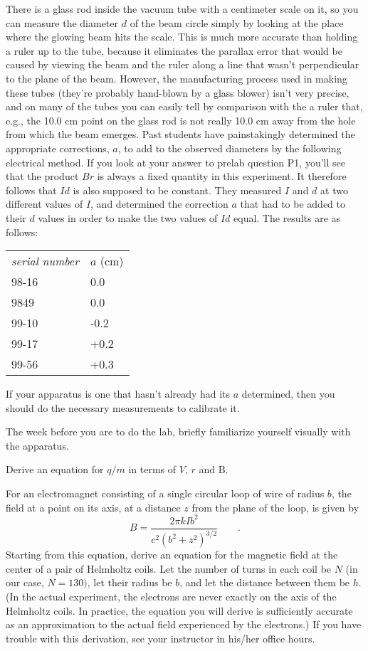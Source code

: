 There is a glass rod inside the vacuum tube
with a centimeter scale
on it, so you can measure the diameter $d$ of the beam circle
simply by looking at the place where the glowing beam hits
the scale. This is much more accurate than holding a ruler
up to the tube, because it eliminates the parallax error
that would be caused by viewing the beam and the ruler along
a line that wasn't perpendicular to the plane of the beam.
However, the manufacturing process used in making these tubes
(they're probably hand-blown by a glass blower) isn't very
precise, and on many of the tubes you can easily tell by comparison
with the a ruler that, e.g., the 10.0 cm point on the glass rod is
not really 10.0 cm away from the hole from which the beam emerges.
Past students have painstakingly determined the appropriate corrections, $a$,
to add to the observed diameters by the following electrical method.
If you look at your answer to prelab question P1, you'll see that the
product $Br$ is always a fixed quantity in this experiment. It therefore
follows that $Id$ is also supposed to be constant. They measured $I$ and $d$
at two different values of $I$, and determined the correction $a$ that had
to be added to their $d$ values in order to make the two values of $Id$
equal. The results are as follows:

\begin{tabular}{ll}
  \emph{serial number} & $a$ (cm) \\
  98-16 & 0.0 \\
  9849  & 0.0 \\
  99-10 & -0.2 \\
  99-17 & +0.2 \\
  99-56 & +0.3
\end{tabular}

If your apparatus is one that hasn't already had its $a$ determined, then
you should do the necessary measurements to calibrate it.

\prelab

The week before you are to do the lab, briefly familiarize
yourself visually with the apparatus.

\hvsafety


\prelabquestion  Derive an equation for $q/m$ in terms of $V$, $r$ and B.

\prelabquestion  For an electromagnet consisting of a single circular
loop of wire of radius $b$, the field at a point on its
axis, at a distance $z$ from the plane of the loop, is given by
\begin{equation*}
      B = \frac{2\pi kIb^2}{ c^2( b^2+ z^2)^{3/2}} \qquad .
\end{equation*}
Starting from this equation, derive an equation for the
magnetic field at the center of a pair of Helmholtz coils.
Let the number of turns in each coil be $N$ (in our case,
$N=130)$, let their radius be $b$, and let the distance
between them be $h$. (In the actual experiment, the
electrons are never exactly on the axis of the Helmholtz
coils. In practice, the equation you will derive is
sufficiently accurate as an approximation to the actual
field experienced by the electrons.) If you have trouble
with this derivation, see your instructor in his/her office hours.

